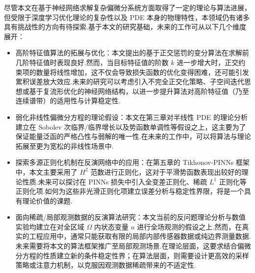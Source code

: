 尽管本文在基于神经网络求解复杂偏微分系统方面取得了一定的理论与算法进展，但受限于深度学习优化理论的复杂性以及 PDE 本身的物理特性，本领域仍有诸多具有挑战性的方向有待探索.基于本文的研究基础，未来的工作可从以下几个维度展开：
\begin{itemize}
    \item 高阶特征值算法的拓展与优化：本文提出的基于正交惩罚的变分算法在求解前几阶特征值时表现良好.然而，当目标特征值的阶数 $k$ 进一步增大时，正交约束项的数量将线性增加，这不仅会导致损失函数的优化变得困难，还可能引发累积误差放大效应.未来的研究可以考虑引入不完全正交化策略、子空间迭代思想或基于复流形优化的神经网络结构，以进一步提升算法对高阶特征值（乃至连续谱带）的适用性与计算稳定性.
    \item 弱化非线性偏微分方程的理论假设：本文在第三章对半线性 PDE 的理论分析建立在 Sobolev 次临界/临界增长以及势函数单调性等假设之上，这主要为了保证能量泛函的严格凸性与弱解的唯一性.在未来的工作中，可以将算法与理论拓展至更为宽松的非线性场景中.
    \item 探索多源正则化机制在反演网络中的应用：在第五章的 Tikhonov-PINNs 框架中，本文主要采用了 $H^2$ 范数进行正则化，这对于平滑势函数表现出较好的理论性质.未来可以探讨在 PINNs 损失中引入全变差正则化、稀疏 $L^1$ 正则化等正则化项.如何为这些非光滑正则化项建立误差分析与稳定性界限，将是一个具有理论价值的课题.
    \item 面向稀疏/局部观测数据的反演算法研究：本文当前的反问题理论分析与数值实验均建立在对全区域 $\Omega$ 内状态变量 $u$ 进行全场观测的假设之上.然而，在真实的工程应用中，通常只能获取有限的局部内部传感器数据或纯边界测量数据.未来需要将本文的算法框架推广至局部观测场景.在理论层面，这要求结合偏微分方程的性质建立新的条件稳定性界；在算法层面，则需要设计更高效的采样策略或注意力机制，以克服因观测数据稀疏带来的不适定性.
\end{itemize}
